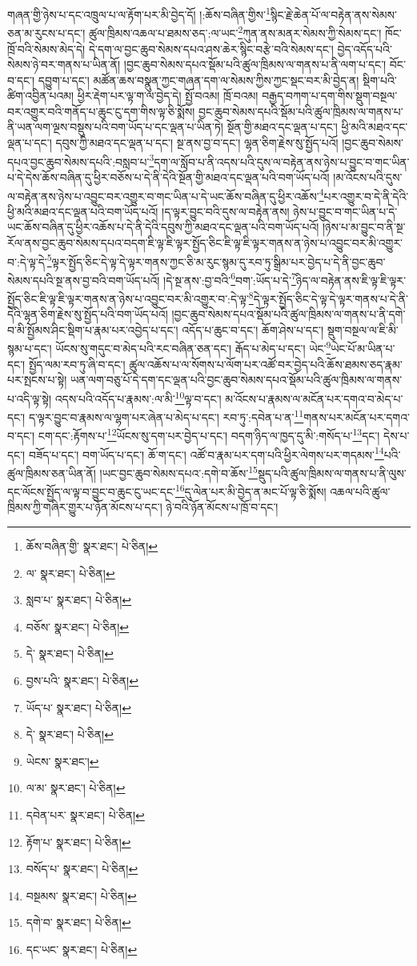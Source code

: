 གཞན་གྱི་ཉེས་པ་དང་འཁྲུལ་པ་ལ་རྟོག་པར་མི་བྱེད་དོ། །:ཆོས་བཞིན་གྱིས་\footnote{ཆོས་བཞིན་གྱི་  སྣར་ཐང་།  པེ་ཅིན། }སྙིང་རྗེ་ཆེན་པོ་ལ་བརྟེན་ནས་སེམས་ཅན་མ་རུངས་པ་དང་། ཚུལ་ཁྲིམས་འཆལ་པ་ཐམས་ཅད་:ལ་ཡང་\footnote{ལ་  སྣར་ཐང་།  པེ་ཅིན། }ཀུན་ནས་མནར་སེམས་ཀྱི་སེམས་དང་། ཁོང་ཁྲོ་བའི་སེམས་མེད་དེ། དེ་དག་ལ་བྱང་ཆུབ་སེམས་དཔའ་ཤས་ཆེར་སྙིང་བརྩེ་བའི་སེམས་དང་། བྱེད་འདོད་པའི་སེམས་ཉེ་བར་གནས་པ་ཡིན་ནོ། །བྱང་ཆུབ་སེམས་དཔའ་སྡོམ་པའི་ཚུལ་ཁྲིམས་ལ་གནས་པ་ནི་ལག་པ་དང་། བོང་བ་དང་། དབྱུག་པ་དང་། མཚོན་ཆས་བསྣུན་ཀྱང་གཞན་དག་ལ་སེམས་ཀྱིས་ཀྱང་སྡང་བར་མི་བྱེད་ན། སྡིག་པའི་ཚིག་འབྱིན་པའམ། ཕྱིར་རྡེག་པར་ལྟ་ག་ལ་བྱེད་དེ། སྤྱོ་བའམ། ཁྲོ་བའམ། བརྒྱད་བཀག་པ་དག་གིས་སྡུག་བསྔལ་བར་འགྱུར་བའི་གནོད་པ་ཆུང་ངུ་དག་གིས་ལྟ་ཅི་སྨོས། བྱང་ཆུབ་སེམས་དཔའི་སྡོམ་པའི་ཚུལ་ཁྲིམས་ལ་གནས་པ་ནི་ཡན་ལག་ལྔས་བསྡུས་པའི་བག་ཡོད་པ་དང་ལྡན་པ་ཡིན་ཏེ། སྔོན་གྱི་མཐའ་དང་ལྡན་པ་དང་། ཕྱི་མའི་མཐའ་དང་ལྡན་པ་དང་། དབུས་ཀྱི་མཐའ་དང་ལྡན་པ་དང་། སྔ་ནས་བྱ་བ་དང་། ལྷན་ཅིག་རྗེས་སུ་སྤྱོད་པའོ། །བྱང་ཆུབ་སེམས་དཔའ་བྱང་ཆུབ་སེམས་དཔའི་:བསླབ་པ་\footnote{སླབ་པ་  སྣར་ཐང་།  པེ་ཅིན། }དག་ལ་སློབ་པ་ནི་འདས་པའི་དུས་ལ་བརྟེན་ནས་ཉེས་པ་བྱུང་བ་གང་ཡིན་པ་དེ་དེས་ཆོས་བཞིན་དུ་ཕྱིར་བཅོས་པ་དེ་ནི་དེའི་སྔོན་གྱི་མཐའ་དང་ལྡན་པའི་བག་ཡོད་པའོ། །མ་འོངས་པའི་དུས་ལ་བརྟེན་ནས་ཉེས་པ་འབྱུང་བར་འགྱུར་བ་གང་ཡིན་པ་དེ་ཡང་ཆོས་བཞིན་དུ་ཕྱིར་འཆོས་\footnote{བཅོས་  སྣར་ཐང་།  པེ་ཅིན། }པར་འགྱུར་བ་དེ་ནི་དེའི་ཕྱི་མའི་མཐའ་དང་ལྡན་པའི་བག་ཡོད་པའོ། །ད་ལྟར་བྱུང་བའི་དུས་ལ་བརྟེན་ནས། ཉེས་པ་བྱུང་བ་གང་ཡིན་པ་དེ་ཡང་ཆོས་བཞིན་དུ་ཕྱིར་འཆོས་པ་དེ་ནི་དེའི་དབུས་ཀྱི་མཐའ་དང་ལྡན་པའི་བག་ཡོད་པའོ། །ཉེས་པ་མ་བྱུང་བ་ནི་སྔ་རོལ་ནས་བྱང་ཆུབ་སེམས་དཔའ་བདག་ཇི་ལྟ་ཇི་ལྟར་སྤྱོད་ཅིང་ཇི་ལྟ་ཇི་ལྟར་གནས་ན་ཉེས་པ་འབྱུང་བར་མི་འགྱུར་བ་:དེ་ལྟ་དེ་\footnote{དེ་  སྣར་ཐང་།  པེ་ཅིན། }ལྟར་སྤྱོད་ཅིང་དེ་ལྟ་དེ་ལྟར་གནས་ཀྱང་ཅི་མ་རུང་སྙམ་དུ་རབ་ཏུ་སྒྲིམ་པར་བྱེད་པ་དེ་ནི་བྱང་ཆུབ་སེམས་དཔའི་སྔ་ནས་བྱ་བའི་བག་ཡོད་པའོ། །དེ་སྔ་ནས་:བྱ་བའི་\footnote{བྱས་པའི་  སྣར་ཐང་།  པེ་ཅིན། }བག་:ཡོད་པ་དེ་\footnote{ཡོད་པ་  སྣར་ཐང་།  པེ་ཅིན། }ཉིད་ལ་བརྟེན་ནས་ཇི་ལྟ་ཇི་ལྟར་སྤྱོད་ཅིང་ཇི་ལྟ་ཇི་ལྟར་གནས་ན་ཉེས་པ་འབྱུང་བར་མི་འགྱུར་བ་:དེ་ལྟ་\footnote{དེ་  སྣར་ཐང་།  པེ་ཅིན། }དེ་ལྟར་སྤྱོད་ཅིང་དེ་ལྟ་དེ་ལྟར་གནས་པ་དེ་ནི་དེའི་ལྷན་ཅིག་རྗེས་སུ་སྤྱོད་པའི་བག་ཡོད་པའོ། །བྱང་ཆུབ་སེམས་དཔའ་སྡོམ་པའི་ཚུལ་ཁྲིམས་ལ་གནས་པ་ནི་དགེ་བ་མི་སྤྱོམས་ཤིང་སྡིག་པ་རྣམ་པར་འབྱེད་པ་དང་། འདོད་པ་ཆུང་བ་དང་། ཆོག་ཤེས་པ་དང་། སྡུག་བསྔལ་ལ་ཇི་མི་སྙམ་པ་དང་། ཡོངས་སུ་གདུང་བ་མེད་པའི་རང་བཞིན་ཅན་དང་། རྒོད་པ་མེད་པ་དང་། ཡེང་\footnote{ཡེངས་  སྣར་ཐང་། }ཡེང་པོ་མ་ཡིན་པ་དང་། སྤྱོད་ལམ་རབ་ཏུ་ཞི་བ་དང་། ཚུལ་འཆོས་པ་ལ་སོགས་པ་ལོག་པར་འཚོ་བར་བྱེད་པའི་ཆོས་ཐམས་ཅད་རྣམ་པར་སྤངས་པ་སྟེ། ཡན་ལག་བཅུ་པོ་དེ་དག་དང་ལྡན་པའི་བྱང་ཆུབ་སེམས་དཔའ་སྡོམ་པའི་ཚུལ་ཁྲིམས་ལ་གནས་པ་འདི་ལྟ་སྟེ། འདས་པའི་འདོད་པ་རྣམས་:ལ་མི་\footnote{ལ་མ་  སྣར་ཐང་།  པེ་ཅིན། }ལྟ་བ་དང་། མ་འོངས་པ་རྣམས་ལ་མངོན་པར་དགའ་བ་མེད་པ་དང་། ད་ལྟར་བྱུང་བ་རྣམས་ལ་ལྷག་པར་ཞེན་པ་མེད་པ་དང་། རབ་ཏུ་:དབེན་པ་ན་\footnote{དབེན་པར་  སྣར་ཐང་།  པེ་ཅིན། }གནས་པར་མངོན་པར་དགའ་བ་དང་། ངག་དང་:རྟོགས་པ་\footnote{རྟོག་པ་  སྣར་ཐང་།  པེ་ཅིན། }ཡོངས་སུ་དག་པར་བྱེད་པ་དང་། བདག་ཉིད་ལ་ཁྱད་དུ་མི་:གསོད་པ་\footnote{བསོད་པ་  སྣར་ཐང་།  པེ་ཅིན། }དང་། དེས་པ་དང་། བཟོད་པ་དང་། བག་ཡོད་པ་དང་། ཆོ་ག་དང་། འཚོ་བ་རྣམ་པར་དག་པའི་ཕྱིར་ལེགས་པར་གདམས་\footnote{བསྔམས་  སྣར་ཐང་།  པེ་ཅིན། }པའི་ཚུལ་ཁྲིམས་ཅན་ཡིན་ནོ། །ཡང་བྱང་ཆུབ་སེམས་དཔའ་:དགེ་བ་ཆོས་\footnote{དགེ་བ་  སྣར་ཐང་།  པེ་ཅིན། }སྡུད་པའི་ཚུལ་ཁྲིམས་ལ་གནས་པ་ནི་ལུས་དང་ལོངས་སྤྱོད་ལ་ལྟ་བ་བྱུང་བ་ཆུང་ངུ་ཡང་དང་\footnote{དང་ཡང་  སྣར་ཐང་།  པེ་ཅིན། }དུ་ལེན་པར་མི་བྱེད་ན་མང་པོ་ལྟ་ཅི་སྨོས། འཆལ་པའི་ཚུལ་ཁྲིམས་ཀྱི་གཞིར་གྱུར་པ་ཉོན་མོངས་པ་དང་། ཉེ་བའི་ཉོན་མོངས་པ་ཁྲོ་བ་དང་། 